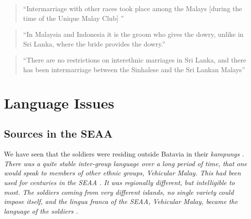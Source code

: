 %
%



\begin{quote}
    ``Intermarriage with other races took place among the Malays [during the time of the Unique Malay Club] ''\citet[83f]{Saldin2003}
\end{quote}

\begin{quote}
    ``In Malaysia and Indonesia it is the groom who gives the dowry, unlike in Sri Lanka, where the bride provides the dowry.''\citet[2]{Saldin2003}
\end{quote}


\begin{quotation}
    ``There are no restrictions on interethnic marriages in Sri Lanka, and there has been intermarriage between the Sinhalese and the Sri Lankan Malays''\citet[9]{Jayasuriya2002}
\end{quotation}



\section{Language Issues}\label{sec:slmbg:LanguageIssues}
\subsection{Sources in the SEAA}\label{sec:slmbg:SourcesintheSEAA}
We have seen that the soldiers were residing outside Batavia in their \em kampungs \em.
There was a quite stable inter-group language over a long period of time, that one would speak to members of other ethnic groups, Vehicular Malay. This had been used for centuries in the SEAA \citep[14f.]{SmithRH}. It was regionally different, but intelligible to most. The soldiers coming from very different islands, no single variety could impose itself, and the lingua franca of the SEAA, Vehicular Malay, became the language of the soldiers \citep[11]{Hussainmiya1987}.

